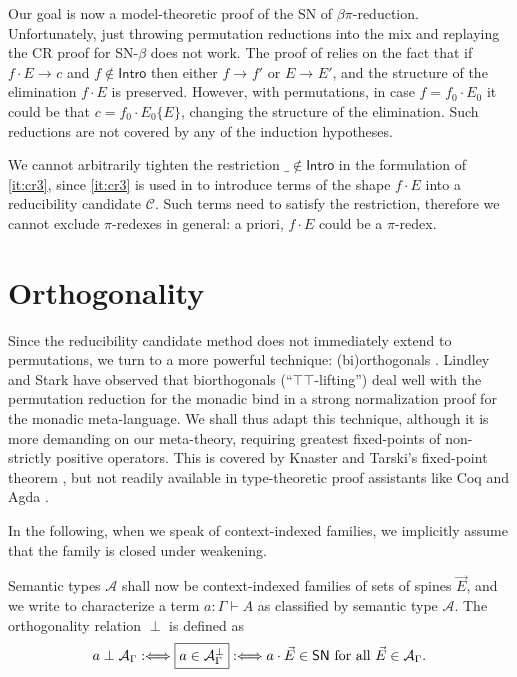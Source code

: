 \documentclass[a4paper,USenglish,cleveref, autoref, thm-restate]{lipics-v2019}
\newcommand{\defiff}{\mathrel{{{:}{\Longleftrightarrow}}}}
\newcommand{\red}[1][]{\longrightarrow_{#1}}
\newcommand{\A}{\mathcal{A}}
\newcommand{\C}{\mathcal{C}}
\newcommand{\SN}{\mathsf{SN}}
\newcommand{\Intro}{\mathsf{Intro}}
\begin{document}
Our goal is now a model-theoretic proof of the SN of $\beta\pi$-reduction.
Unfortunately,
just throwing permutation reductions into the mix and replaying the CR
proof for SN-$\beta$ does not work.  The proof of  relies
on the fact that if $f \cdot E \red c$ and $f \not\in \Intro$ then
either $f \red f'$ or $E \red E'$, and the structure of the
elimination $f \cdot E$ is preserved.  However, with permutations, in
case $f = f_0 \cdot E_0$ it could be that $c = f_0 \cdot E_0\{E\}$,
changing the structure of the elimination.
Such reductions are not covered by any of the induction hypotheses.

We cannot arbitrarily tighten the restriction $\_ \not\in \Intro$ in
the formulation of \ref{it:cr3}, since \ref{it:cr3} is used in  to
introduce terms of the shape $f \cdot E$
into a reducibility candidate $\C$.  Such terms need to satisfy the
restriction, therefore we cannot exclude $\pi$-redexes in general: a
priori, $f \cdot E$ could be a $\pi$-redex.

\section{Orthogonality}
\label{sec:biortho}
\label{sec:ortho}

Since the reducibility candidate method does not immediately extend to
permutations, we turn to a more powerful technique: (bi)orthogonals
\cite{birkhoff:latticeTheory,pitts:mscs00,danosKrivine:csl00,girard:locusSolum,vouillonMellies:semanticTypes,abel:PhD}.
Lindley and Stark \cite{lindleyStark:tlca05} have observed that
biorthogonals (``$\top\top$-lifting'') deal well with the permutation
reduction for the monadic bind in a strong normalization proof for the
monadic meta-language.  We shall thus adapt this technique, although
it is more demanding on our meta-theory, requiring greatest
fixed-points of non-strictly positive operators.  This is covered by
Knaster and Tarski's fixed-point theorem \cite{tarski:fixpoint}, but
not readily available in type-theoretic proof assistants like Coq
\cite{coq:8120} and
Agda \cite{agda:261}.

In the following, when we speak of context-indexed families, we
implicitly assume that the family is closed under weakening.

Semantic types $\A$ shall now be context-indexed families of sets of
spines $\vec E$, and we write \fbox{$a \perp \A_\Gamma$} to
characterize a term $a : \Gamma \vdash A$ as classified by semantic
type $\A$.  The orthogonality relation $\perp$ is defined as
\[
  a \perp \A_\Gamma \defiff
  \fbox{$a \in \A_\Gamma^\perp$} \defiff
  a \cdot \vec E \in \SN \mbox{ for all } \vec E \in \A_\Gamma
  .
\]
\end{document}

